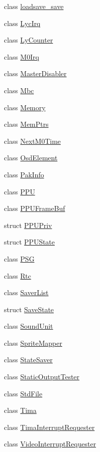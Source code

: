 \begin{DoxyCompactItemize}
\item 
class \hyperlink{classgambatte_1_1loadsave__save}{loadsave\+\_\+save}
\item 
class \hyperlink{classgambatte_1_1LycIrq}{Lyc\+Irq}
\item 
class \hyperlink{classgambatte_1_1LyCounter}{Ly\+Counter}
\item 
class \hyperlink{classgambatte_1_1M0Irq}{M0\+Irq}
\item 
class \hyperlink{classgambatte_1_1MasterDisabler}{Master\+Disabler}
\item 
class \hyperlink{classgambatte_1_1Mbc}{Mbc}
\item 
class \hyperlink{classgambatte_1_1Memory}{Memory}
\item 
class \hyperlink{classgambatte_1_1MemPtrs}{Mem\+Ptrs}
\item 
class \hyperlink{classgambatte_1_1NextM0Time}{Next\+M0\+Time}
\item 
class \hyperlink{classgambatte_1_1OsdElement}{Osd\+Element}
\item 
class \hyperlink{classgambatte_1_1PakInfo}{Pak\+Info}
\item 
class \hyperlink{classgambatte_1_1PPU}{P\+PU}
\item 
class \hyperlink{classgambatte_1_1PPUFrameBuf}{P\+P\+U\+Frame\+Buf}
\item 
struct \hyperlink{structgambatte_1_1PPUPriv}{P\+P\+U\+Priv}
\item 
struct \hyperlink{structgambatte_1_1PPUState}{P\+P\+U\+State}
\item 
class \hyperlink{classgambatte_1_1PSG}{P\+SG}
\item 
class \hyperlink{classgambatte_1_1Rtc}{Rtc}
\item 
class \hyperlink{classgambatte_1_1SaverList}{Saver\+List}
\item 
struct \hyperlink{structgambatte_1_1SaveState}{Save\+State}
\item 
class \hyperlink{classgambatte_1_1SoundUnit}{Sound\+Unit}
\item 
class \hyperlink{classgambatte_1_1SpriteMapper}{Sprite\+Mapper}
\item 
class \hyperlink{classgambatte_1_1StateSaver}{State\+Saver}
\item 
class \hyperlink{classgambatte_1_1StaticOutputTester}{Static\+Output\+Tester}
\item 
class \hyperlink{classgambatte_1_1StdFile}{Std\+File}
\item 
class \hyperlink{classgambatte_1_1Tima}{Tima}
\item 
class \hyperlink{classgambatte_1_1TimaInterruptRequester}{Tima\+Interrupt\+Requester}
\item 
class \hyperlink{classgambatte_1_1VideoInterruptRequester}{Video\+Interrupt\+Requester}
\end{DoxyCompactItemize}
